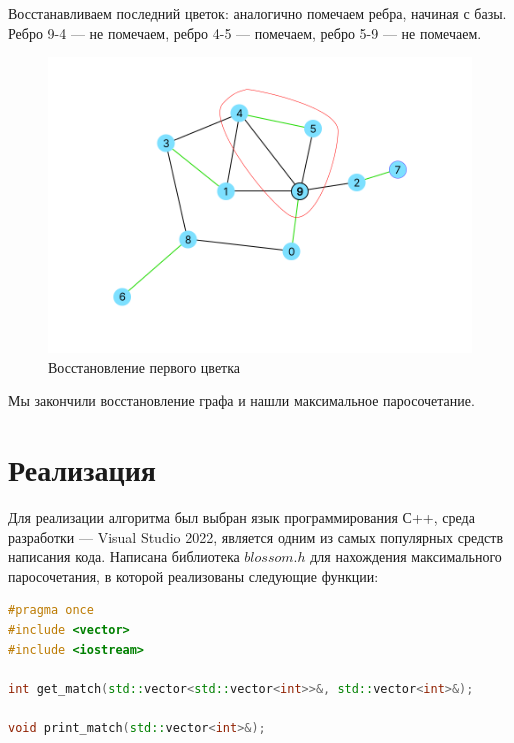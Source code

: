 \documentclass[14pt, a4paper]{extarticle}
\begin{document}
    \pagebreak

    Восстанавливаем последний цветок: аналогично помечаем ребра, начиная с базы. Ребро 9-4 --- не помечаем, ребро 4-5 --- помечаем, ребро 5-9 --- не помечаем. 

    \begin{figure}[ht!]
        \centering
        \includegraphics[scale=0.3]{7.png}
        \caption{Восстановление первого цветка}
        \label{fig:my_label}
    \end{figure} 

    Мы закончили восстановление графа и нашли максимальное паросочетание.

    \pagebreak
    
    \section*{Реализация}

    Для реализации алгоритма был выбран язык программирования С++, среда разработки --- Visual Studio 2022, является одним из самых популярных средств написания кода.
    Написана библиотека $blossom.h$ для нахождения максимального паросочетания, в которой реализованы следующие функции:

    \begin{lstlisting}[language=c++]
#pragma once
#include <vector>
#include <iostream>

int get_match(std::vector<std::vector<int>>&, std::vector<int>&);

void print_match(std::vector<int>&);
    \end{lstlisting}
\end{document}
